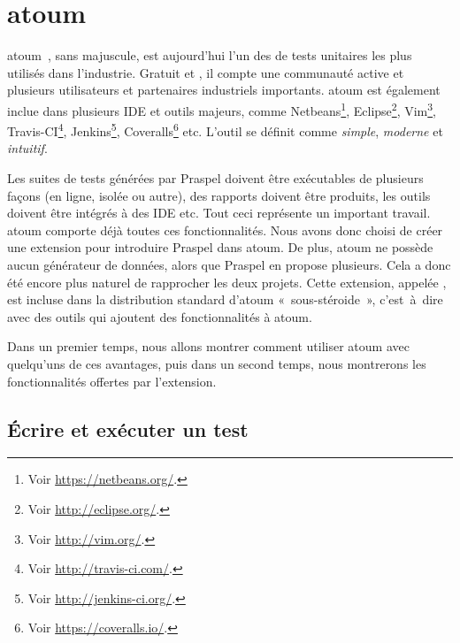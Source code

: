 \section{atoum}
\label{section:tools:atoum}

atoum~, sans majuscule, est aujourd'hui l'un des
 de tests unitaires les plus utilisés dans l'industrie.
Gratuit et , il compte une communauté active et plusieurs
utilisateurs et partenaires industriels importants. atoum est également inclue
dans plusieurs IDE et outils majeurs, comme Netbeans\footnote{Voir
\url{https://netbeans.org/}.}, Eclipse\footnote{Voir
\url{http://eclipse.org/}.}, Vim\footnote{Voir \url{http://vim.org/}.},
Travis-CI\footnote{Voir \url{http://travis-ci.com/}.}, Jenkins\footnote{Voir
\url{http://jenkins-ci.org/}.}, Coveralls\footnote{Voir
\url{https://coveralls.io/}.} etc. L'outil se définit comme {\em simple}, {\em
moderne} et {\em intuitif}.

Les suites de tests générées par Praspel doivent être exécutables de plusieurs
façons (en ligne, isolée ou autre), des rapports doivent être produits, les
outils doivent être intégrés à des IDE etc. Tout ceci représente un important
travail. atoum comporte déjà toutes ces fonctionnalités. Nous avons donc choisi
de créer une extension pour introduire Praspel dans atoum. De plus, atoum ne
possède aucun générateur de données, alors que Praspel en propose plusieurs.
Cela a donc été encore plus naturel de rapprocher les deux projets. Cette
extension, appelée , est incluse dans la
distribution standard d'atoum «~sous-stéroide~», c'est~à~dire avec des outils
qui ajoutent des fonctionnalités à atoum.

Dans un premier temps, nous allons montrer comment utiliser atoum avec
quelqu'uns de ces avantages, puis dans un second temps, nous montrerons les
fonctionnalités offertes par l'extension.

\subsection{Écrire et exécuter un test}

